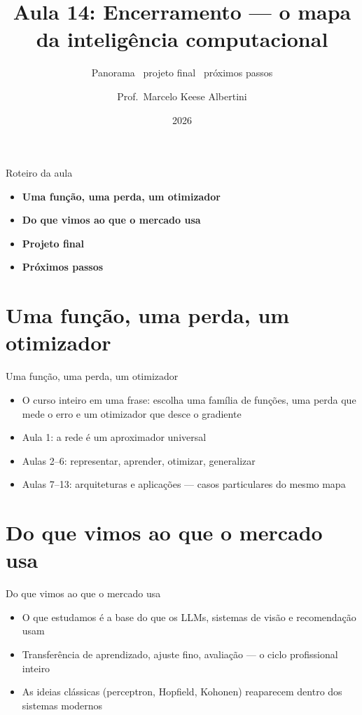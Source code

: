 \documentclass[aspectratio=169, 11pt]{beamer}
\title[Aula 14 — Encerramento]{Aula 14: Encerramento — o mapa da inteligência computacional}
\subtitle[GBC073 — Inteligência Computacional]{Panorama \textbullet\ projeto final \textbullet\ próximos passos}
\author[Prof.\ Marcelo Albertini]{Prof.\ Marcelo Keese Albertini}
\institute{GBC073 — Inteligência Computacional \textbullet\ Universidade Federal de Uberlândia}
\date{2026}
\begin{document}
\begin{frame}
  \titlepage
\end{frame}

\begin{frame}{Roteiro da aula}
  \begin{itemize}\setlength{\itemsep}{0.5ex}
    \item<1-> \textbf{Uma função, uma perda, um otimizador}
    \item<2-> \textbf{Do que vimos ao que o mercado usa}
    \item<3-> \textbf{Projeto final}
    \item<4-> \textbf{Próximos passos}
  \end{itemize}
\end{frame}

\section{Uma função, uma perda, um otimizador}

\begin{frame}{Uma função, uma perda, um otimizador}
  \begin{itemize}\setlength{\itemsep}{0.4ex}
    \item O curso inteiro em uma frase: escolha uma família de funções,
          uma perda que mede o erro e um otimizador que desce o gradiente
    \item Aula 1: a rede é um aproximador universal
    \item Aulas 2--6: representar, aprender, otimizar, generalizar
    \item Aulas 7--13: arquiteturas e aplicações — casos particulares do
          mesmo mapa
  \end{itemize}
\end{frame}

\section{Do que vimos ao que o mercado usa}

\begin{frame}{Do que vimos ao que o mercado usa}
  \begin{itemize}\setlength{\itemsep}{0.4ex}
    \item O que estudamos é a base do que os LLMs, sistemas de visão e
          recomendação usam
    \item Transferência de aprendizado, ajuste fino, avaliação — o ciclo
          profissional inteiro
    \item As ideias clássicas (perceptron, Hopfield, Kohonen) reaparecem
          dentro dos sistemas modernos
  \end{itemize}
\end{frame}
\end{document}
